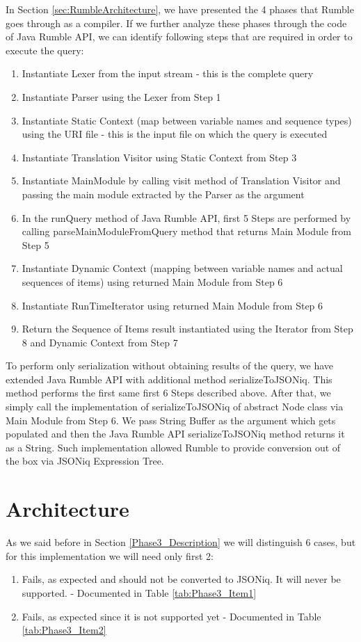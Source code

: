 In Section \ref{sec:RumbleArchitecture}, we have presented the 4 phases that Rumble goes through as a compiler. If we further analyze these phases through the code of Java Rumble API, we can identify following steps that are required in order to execute the query:
\begin{enumerate}
	\item Instantiate Lexer from the input stream - this is the complete query
	\item Instantiate Parser using the Lexer from Step 1
	\item Instantiate Static Context  (map between variable names and sequence types) using the URI file - this is the input file on which the query is executed 
	\item Instantiate Translation Visitor using Static Context from Step 3
	\item Instantiate MainModule by calling visit method of Translation Visitor and passing the main module extracted by the Parser as the argument
	\item In the runQuery method of Java Rumble API, first 5 Steps are performed by calling parseMainModuleFromQuery method that returns Main Module from Step 5
	\item Instantiate Dynamic Context (mapping between variable names and actual sequences of items) using returned Main Module from Step 6
	\item Instantiate RunTimeIterator using returned Main Module from Step 6
	\item Return the Sequence of Items result instantiated using the Iterator from Step 8 and Dynamic Context from Step 7
\end{enumerate}

To perform only serialization without obtaining results of the query, we have extended Java Rumble API with additional method serializeToJSONiq. This method performs the first same first 6 Steps described above. After that, we simply call the implementation of serializeToJSONiq of abstract Node class via Main Module from Step 6. We pass String Buffer as the argument which gets populated and then the Java Rumble API serializeToJSONiq method returns it as a String. Such implementation allowed Rumble to provide conversion out of the box via JSONiq Expression Tree.

\section{Architecture}
\label{sec:TestConverterImplementation}
As we said before in Section \ref{Phase3_Description} we will distinguish 6 cases, but for this implementation we will need only first 2: 
\begin{enumerate}
	\item Fails, as expected and should not be converted to JSONiq. It will never be supported. - Documented in Table \ref{tab:Phase3_Item1}
	\item Fails, as expected since it is not supported yet - Documented in Table \ref{tab:Phase3_Item2}
\end{enumerate}

